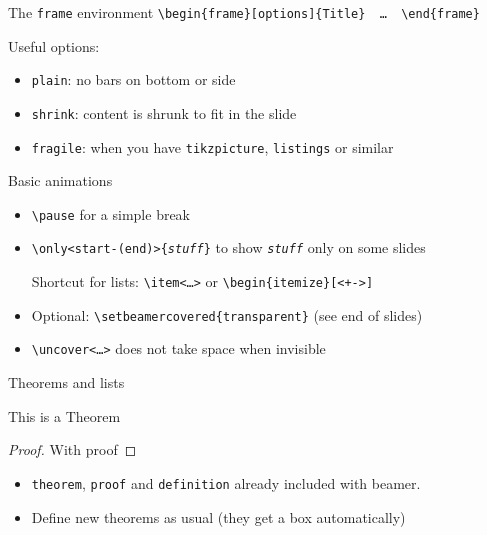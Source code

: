 \documentclass[11pt]{beamer}
\newcommand{\bs}{\textbackslash}
\begin{document}
\begin{frame}{The \texttt{frame} environment}
  \texttt{\bs begin\{frame\}[options]\{Title\} \,\dots\, \bs end\{frame\}}

  \vspace{0.5cm}
  Useful options:
  \begin{itemize}
    \item \texttt{plain}: no bars on bottom or side
    \item \texttt{shrink}: content is shrunk to fit in the slide
    \item \texttt{fragile}: when you have \texttt{tikzpicture},
          \texttt{listings} or similar 
  \end{itemize}
\end{frame}

\begin{frame}{Basic animations}
  \begin{itemize}
    \item \texttt{\bs pause} for a simple break

    \vspace{0.3cm}
    \item \texttt{\bs only<start-(end)>\{\emph{stuff}\}} to show
          \emph{\texttt{stuff}} only on some slides
          
          Shortcut for lists: \texttt{\bs item<\dots>} or
          \texttt{\bs begin\{itemize\}[<+->]}

    \vspace{0.3cm}
    \item Optional:
          \texttt{\bs setbeamercovered\{transparent\}} (see end of slides)

    \vspace{0.3cm}
    \item \texttt{\bs uncover<\dots>} does not take space when invisible
  \end{itemize}
\end{frame}

\begin{frame}{Theorems and lists}
  \begin{theorem} This is a Theorem \end{theorem}
  \begin{proof} With proof \end{proof}
  
  \begin{itemize}
    \item \texttt{theorem}, \texttt{proof} and \texttt{definition} already
          included with beamer.
    \item Define new theorems as usual (they get a box automatically)
  \end{itemize}
\end{frame}
\end{document}
